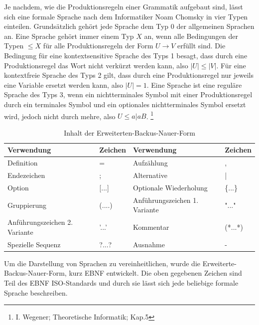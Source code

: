 Je nachdem, wie die Produktionsregeln einer Grammatik aufgebaut sind, lässt sich eine formale Sprache nach dem Informatiker Noam Chomsky in vier Typen einteilen. 
Grundsätzlich gehört jede Sprache dem Typ 0 der allgemeinen Sprachen an. 
Eine Sprache gehört immer einem Typ $X$ an, wenn alle Bedingungen  der Typen $\leq X$ für alle Produktionsregeln der Form $U \rightarrow V$ erfüllt sind. 
Die Bedingung für eine kontextsensitive Sprache des Typs 1 besagt, dass durch eine Produktionsregel das Wort nicht verkürzt werden kann, also $|U| \leq |V|$. 
Für eine kontextfreie Sprache des Typs 2 gilt, dass durch eine Produktionsregel nur jeweils eine Variable ersetzt werden kann, also $|U| = 1$. 
Eine Sprache ist eine reguläre Sprache des Typs 3, wenn ein nichtterminales Symbol mit einer Produktionsregel durch ein terminales Symbol und ein optionales nichtterminales Symbol ersetzt wird, jedoch nicht durch mehre, also $U \leq a|aB$. \footnote{I. Wegener;	Theoretische Informatik; Kap.5}\\
\begin{table}[h!]
\begin{tabular}{|ll|ll|}
\hline
Verwendung                    & Zeichen   & Verwendung                    & Zeichen \\ \hline
Definition                    & =         & Aufzählung                    & ,       \\
Endezeichen                   & ;         & Alternative                   & |       \\
Option                        & {[}...{]} & Optionale Wiederholung        & \{...\} \\
Gruppierung                   & (....)    & Anführungszeichen 1. Variante & "..."   \\
Anführungszeichen 2. Variante & '...'     & Kommentar                      & (*...*) \\
Spezielle Sequenz             & ?...?     & Ausnahme                      & -       \\ \hline
\end{tabular}
\caption{Inhalt der Erweiterten-Backus-Nauer-Form}
\label{ebnf}
\end{table}
Um die Darstellung von Sprachen zu vereinheitlichen, wurde die Erweiterte-Backus-Nauer-Form, kurz EBNF entwickelt. 
Die oben gegebenen Zeichen sind Teil des EBNF ISO-Standards und durch sie lässt sich jede beliebige formale Sprache beschreiben.\\
 
